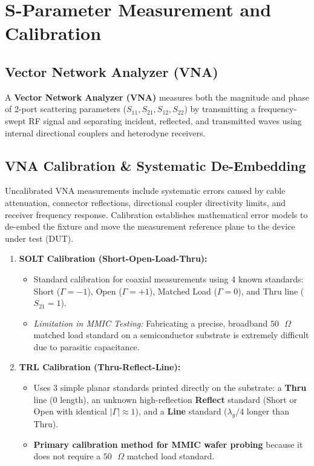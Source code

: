 \documentclass[10pt,a4paper]{article}
\begin{document}
\section{S-Parameter Measurement and Calibration}

\subsection{Vector Network Analyzer (VNA)}
A \textbf{Vector Network Analyzer (VNA)} measures both the magnitude and phase of 2-port scattering parameters ($S_{11}, S_{21}, S_{12}, S_{22}$) by transmitting a frequency-swept RF signal and separating incident, reflected, and transmitted waves using internal directional couplers and heterodyne receivers.

\subsection{VNA Calibration \& Systematic De-Embedding}
Uncalibrated VNA measurements include systematic errors caused by cable attenuation, connector reflections, directional coupler directivity limits, and receiver frequency response. Calibration establishes mathematical error models to de-embed the fixture and move the measurement reference plane to the device under test (DUT).

\begin{enumerate}[leftmargin=*, itemsep=5pt]
  \item \textbf{SOLT Calibration (Short-Open-Load-Thru):}
    \begin{itemize}[leftmargin=*, noitemsep]
      \item Standard calibration for coaxial measurements using 4 known standards: Short ($\Gamma = -1$), Open ($\Gamma = +1$), Matched Load ($\Gamma = 0$), and Thru line ($S_{21} = 1$).
      \item \textit{Limitation in MMIC Testing:} Fabricating a precise, broadband $50\text{ }\Omega$ matched load standard on a semiconductor substrate is extremely difficult due to parasitic capacitance.
    \end{itemize}
  \item \textbf{TRL Calibration (Thru-Reflect-Line):}
    \begin{itemize}[leftmargin=*, noitemsep]
      \item Uses 3 simple planar standards printed directly on the substrate: a \textbf{Thru} line ($0$ length), an unknown high-reflection \textbf{Reflect} standard (Short or Open with identical $|\Gamma| \approx 1$), and a \textbf{Line} standard ($\lambda_g/4$ longer than Thru).
      \item \textbf{Primary calibration method for MMIC wafer probing} because it does not require a $50\text{ }\Omega$ matched load standard.
    \end{itemize}
\end{enumerate}
\end{document}
